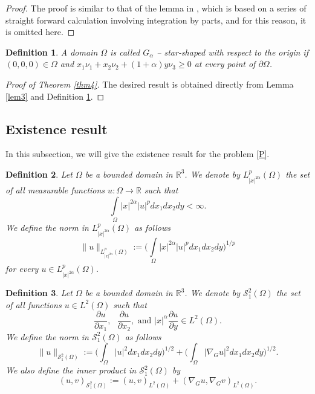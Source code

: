 \documentclass[10pt, reqno]{amsart}
\newtheorem{definition}{Definition}
\begin{document}
	\begin{proof}
		The proof is similar to that of the lemma in \cite{Tri3}, which is based on a series of straight forward calculation involving integration by parts, and for this reason, it is omitted here.
	\end{proof}
	
	\begin{definition}\label{def6}
		A domain $\Omega$ is called $G_\alpha$ -- star-shaped with respect to the origin if $(0, 0, 0) \in \Omega$ and $x_1\nu_1 +x_2\nu_2 + (1+\alpha)y\nu_3 \geq 0$ at every point of $\partial\Omega$.
	\end{definition}
	
	\begin{proof}[Proof of Theorem \ref{thm4}]
		The desired result is obtained directly from Lemma \ref{lem3} and Definition \ref{def6}.
	\end{proof}
	
	
	
	\subsection{Existence result}\label{sec42}
	In this subsection, we will give the existence result for the problem \eqref{P}. 
	\begin{definition}\label{def7}
		Let $\Omega$ be a bounded domain in $\mathbb{R}^3$. We denote  by $L^p_{|x|^{2\alpha}} (\Omega)$ the set of all measurable functions $u:\Omega \to \mathbb{R}$ such that 
		$$\int\limits_\Omega |x|^{2\alpha} |u|^p dx_1dx_2dy < \infty. $$
		We define the norm in $L^p_{|x|^{2\alpha}} (\Omega)$ as follows
		$$\|u\|_{L^p_{|x|^{2\alpha}} (\Omega)} := \bigg(\int\limits_\Omega |x|^{2\alpha} |u|^p dx_1dx_2dy\bigg)^{1/p}$$
		for every $u \in L^p_{|x|^{2\alpha}} (\Omega)$.
	\end{definition}
	
	\begin{definition}\label{def8}
		Let $\Omega$ be a bounded domain in $\mathbb{R}^3$. We denote by $\mathcal{S}^2_1 (\Omega)$ the set of all functions $u\in L^2(\Omega)$ such that 
		$$\dfrac{\partial u}{\partial x_1}, \textrm{ } \dfrac{\partial u}{\partial x_2}, \textrm{ and } |x|^\alpha\dfrac{\partial u}{\partial y} \in L^2(\Omega).$$
		We define the norm in $\mathcal{S}^2_1 (\Omega)$ as follows
		$$ \|u \|_{\mathcal{S}^2_1 (\Omega)} := \bigg( \int_\Omega |u|^2 dx_1dx_2dy \bigg)^{1/2} + \bigg(\int_\Omega |\nabla_G u|^2dx_1dx_2dy\bigg)^{1/2}. $$
		We also define the inner product in $\mathcal{S}^2_1 (\Omega)$ by
		$$(u,v)_{\mathcal{S}^2_1 (\Omega)} := (u,v)_{L^2(\Omega)} + (\nabla_G u, \nabla_G v)_{L^2(\Omega)}.$$
	\end{definition}
	
\end{document}
